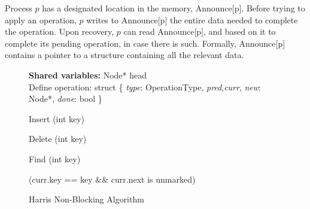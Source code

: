 Process $p$ has a designated location in the memory, Announce[p]. Before trying to apply an operation, $p$ writes to Announce[p] the entire data needed to complete the operation. Upon recovery, $p$ can read Announce[p], and based on it to complete its pending operation, in case there is such. Formally, Announce[p] contains a pointer to a structure containing all the relevant data.


\begin{figure}
	
	\textbf{Shared variables:} Node* head \\
	
	Define operation: struct \{ 
	\emph{type}: OperationType, \emph{pred},\emph{curr}, \emph{new}: Node*, \emph{done}: bool \}
	
	\begin{procedure}[H]
		\caption{Insert (int key)}
		
		
		
	\end{procedure}
	
	
	\begin{procedure}[H]
		\caption{Delete (int key)}
		
		
		
	\end{procedure}
	
	\begin{procedure}[H]
		\caption{Find (int key)}
		
		
		\KwRet (curr.key == key $\&\&$ curr.next is unmarked)\;
		
	\end{procedure}
	
	\caption{Harris Non-Blocking Algorithm}
	\label{Harris original}
\end{figure}